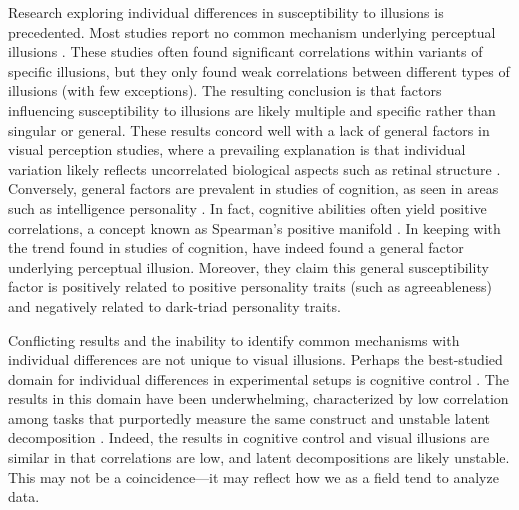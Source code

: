 \documentclass[man, 12pt]{apa7} %
\begin{document}
Research exploring individual differences in susceptibility to illusions is precedented. Most studies report no common mechanism underlying perceptual illusions \parencite[]{Mazuz.etal.2023, Grzeczkowski.etal.2017, Cretenoud.etal.2019, Bosten.etal.2017, Cottier.etal.2023, Ward.etal.2017}. These studies often found significant correlations within variants of specific illusions, but they only found weak correlations between different types of illusions (with few exceptions).  The resulting conclusion is that factors influencing susceptibility to illusions are likely multiple and specific rather than singular or general.  These results concord well with a lack of general factors in visual perception studies, where a prevailing explanation is that individual variation likely reflects uncorrelated biological aspects such as retinal structure \parencite[e.g.,][]{Mollon.etal.2017, Bosten.Mollon.2010}. Conversely, general factors are prevalent in studies of cognition, as seen in areas such as intelligence \parencite[]{Jensen.1998} personality \parencite[]{OConnor.Paunonen.2007}. In fact, cognitive abilities often yield positive correlations, a concept known as Spearman's positive manifold \parencite{Ritchie.2015}. In keeping with the trend found in studies of cognition, \textcite{Makowski.etal.2023} have indeed found a general factor underlying perceptual illusion. Moreover, they claim this general susceptibility factor is positively related to positive personality traits (such as agreeableness) and negatively related to dark-triad personality traits. 

Conflicting results and the inability to identify common mechanisms with individual differences are not unique to visual illusions.  Perhaps the best-studied domain for individual differences in experimental setups is cognitive control \parencite[]{Enkavi.etal.2019, Rey-Mermet.etal.2019, Draheim.etal.2019}.  The results in this domain have been underwhelming, characterized by low correlation among tasks that purportedly measure the same construct and unstable latent decomposition \parencite{Karr.etal.2018}.  Indeed, the results in cognitive control and visual illusions are similar in that correlations are low, and latent decompositions are likely unstable.  This may not be a coincidence---it may reflect how we as a field tend to analyze data. 
\end{document}
